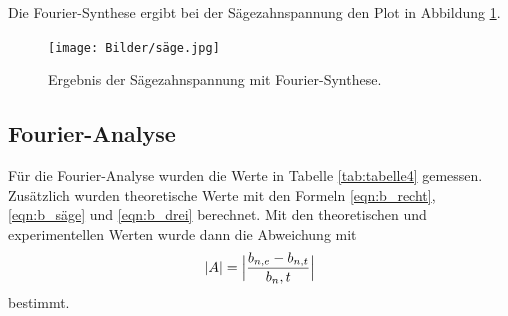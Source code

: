 Die Fourier-Synthese ergibt bei der Sägezahnspannung den Plot in Abbildung \ref{fig:säge}.
\begin{figure}[H]
  \centering
  \texttt{[image: Bilder/säge.jpg]}
  \caption{Ergebnis der Sägezahnspannung mit Fourier-Synthese.}
  \label{fig:säge}
\end{figure}

\subsection{Fourier-Analyse}
Für die Fourier-Analyse wurden die Werte in Tabelle \ref{tab:tabelle4} gemessen. 
Zusätzlich wurden theoretische Werte mit den Formeln \ref{eqn:b_recht}, \ref{eqn:b_säge} und \ref{eqn:b_drei} berechnet.
Mit den theoretischen und experimentellen Werten wurde dann die Abweichung mit 
\begin{equation}
  |A|=\Bigl|\frac{b_{n,e}-b_{n,t}}{b_n,t}\Bigr|
  \label{eqn:abweichung}
\end{equation}
bestimmt.

